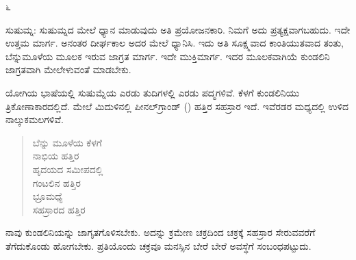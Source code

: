 \begin{center}
೬
\end{center}

\vskip 2pt

ಸುಷುಮ್ನ: ಸುಷುಮ್ನದ ಮೇಲೆ ಧ್ಯಾನ ಮಾಡುವುದು ಅತಿ ಪ್ರಯೋಜನಕಾರಿ. ನಿಮಗೆ ಅದು ಪ್ರತ್ಯಕ್ಷವಾಗಬಹುದು. ಇದೇ ಉತ್ತಮ ಮಾರ್ಗ. ಅನಂತರ ದೀರ್ಘಕಾಲ ಅದರ ಮೇಲೆ ಧ್ಯಾನಿಸಿ. ಇದು ಅತಿ ಸೂಕ್ಷ್ಮವಾದ ಕಾಂತಿಯುತವಾದ ತಂತು, ಬೆನ್ನುಮೂಳೆಯ ಮೂಲಕ ಇರುವ ಜಾಗ್ರತ ಮಾರ್ಗ. ಇದೇ ಮುಕ್ತಿಮಾರ್ಗ. ಇದರ ಮೂಲಕವಾಗಿಯೆ ಕುಂಡಲಿನಿ ಜಾಗ್ರತವಾಗಿ ಮೇಲೇಳುವಂತೆ ಮಾಡಬೇಕು.

\vskip 2pt

ಯೋಗಿಯ ಭಾಷೆಯಲ್ಲಿ ಸುಷುಮ್ನೆಯ ಎರಡು ತುದಿಗಳಲ್ಲಿ ಎರಡು ಪದ್ಮಗಳಿವೆ. ಕೆಳಗೆ ಕುಂಡಲಿನಿಯು ತ್ರಿಕೋಣಾಕಾರದಲ್ಲಿದೆ. ಮೇಲೆ ಮಿದುಳಿನಲ್ಲಿ ಪೀನಲ್‌ಗ್ರಾಂಡ್ () ಹತ್ತಿರ ಸಹಸ್ರಾರ ಇದೆ. ಇವೆರಡರ ಮಧ್ಯದಲ್ಲಿ ಉಳಿದ ನಾಲ್ಕು\break ಕಮಲಗಳಿವೆ.

\vskip 2pt

\begin{verse}
ಬೆನ್ನು ಮೂಳೆಯ ಕೆಳಗೆ\\ನಾಭಿಯ ಹತ್ತಿರ\\ಹೃದಯದ ಸಮೀಪದಲ್ಲಿ\\ಗಂಟಲಿನ ಹತ್ತಿರ\\ಭ್ರೂಮಧ್ಯೆ\\ಸಹಸ್ರಾರದ ಹತ್ತಿರ
\end{verse}

\vskip 2pt

ನಾವು ಕುಂಡಲಿನಿಯನ್ನು ಜಾಗೃತಗೊಳಿಸಬೇಕು. ಅದನ್ನು ಕ್ರಮೇಣ ಚಕ್ರದಿಂದ ಚಕ್ರಕ್ಕೆ ಸಹಸ್ರಾರ ಸೇರುವವರೆಗೆ ತೆಗೆದುಕೊಂಡು ಹೋಗಬೇಕು. ಪ್ರತಿಯೊಂದು ಚಕ್ರವೂ ಮನಸ್ಸಿನ ಬೇರೆ ಬೇರೆ ಅವಸ್ಥೆಗೆ ಸಂಬಂಧಪಟ್ಟುದು.

